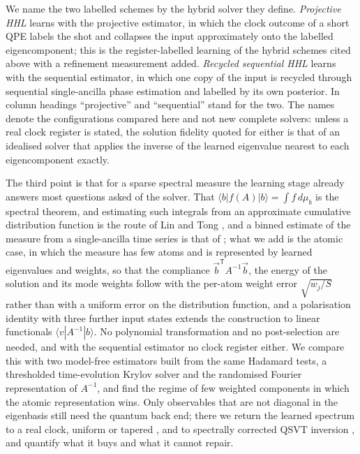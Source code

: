\documentclass[journal]{IEEEtran}
\begin{document}
We name the two labelled schemes by the hybrid solver they define. \emph{Projective HHL} learns with the projective estimator, in which the clock outcome of a short QPE labels the shot and collapses the input approximately onto the labelled eigencomponent; this is the register-labelled learning of the hybrid schemes cited above with a refinement measurement added. \emph{Recycled sequential HHL} learns with the sequential estimator, in which one copy of the input is recycled through sequential single-ancilla phase estimation and labelled by its own posterior. In column headings ``projective'' and ``sequential'' stand for the two. The names denote the configurations compared here and not new complete solvers: unless a real clock register is stated, the solution fidelity quoted for either is that of an idealised solver that applies the inverse of the learned eigenvalue nearest to each eigencomponent exactly.

The third point is that for a sparse spectral measure the learning stage already answers most questions asked of the solver. That $\langle b|f(A)|b\rangle=\int f\,d\mu_b$ is the spectral theorem, and estimating such integrals from an approximate cumulative distribution function is the route of Lin and Tong \cite{LinTong2022}, and a binned estimate of the measure from a single-ancilla time series is that of \cite{Somma2019}; what we add is the atomic case, in which the measure has few atoms and is represented by learned eigenvalues and weights, so that the compliance $\vec b^{\mathsf T}A^{-1}\vec b$, the energy of the solution and its mode weights follow with the per-atom weight error $\sqrt{w_j/S}$ rather than with a uniform error on the distribution function, and a polarisation identity with three further input states extends the construction to linear functionals $\langle v|A^{-1}|b\rangle$. No polynomial transformation and no post-selection are needed, and with the sequential estimator no clock register either. We compare this with two model-free estimators built from the same Hadamard tests, a thresholded time-evolution Krylov solver \cite{YuZhou2026,Park2026} and the randomised Fourier representation of $A^{-1}$, and find the regime of few weighted components in which the atomic representation wins. Only observables that are not diagonal in the eigenbasis still need the quantum back end; there we return the learned spectrum to a real clock, uniform or tapered \cite{HHL2009,Rendon2022,Patel2026,Kristjuhan2026}, and to spectrally corrected QSVT inversion \cite{Suresh2026}, and quantify what it buys and what it cannot repair.
\end{document}
